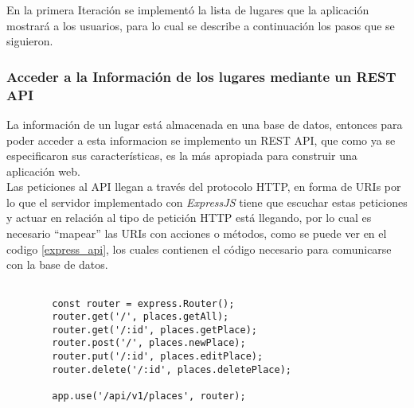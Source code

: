 %
%
%
%

En la primera Iteración se implementó la lista de lugares que la aplicación mostrará a los usuarios, para lo cual se describe a continuación los pasos que se siguieron. \\


\subsubsection{Acceder a la Información de los lugares mediante un REST API }


La información de un lugar está almacenada en una base de datos, entonces para poder acceder a esta informacion se implemento un REST API, que como ya se especificaron sus características, es la más apropiada para construir una aplicación web. \\

Las peticiones al API llegan a través del protocolo HTTP, en forma de URIs por lo que el servidor implementado con \emph{ExpressJS} tiene que escuchar estas peticiones y actuar en relación al tipo de petición HTTP está llegando, por lo cual es necesario ``mapear'' las URIs con acciones o métodos, como se puede ver en el codigo \ref{express_api}, los cuales contienen el código necesario para comunicarse con la base de datos. \\


\begin{center}
  \begin{lstlisting}[label=express_api,caption=Declarando API REST con ExpressJS]

        const router = express.Router();
        router.get('/', places.getAll);
        router.get('/:id', places.getPlace);
        router.post('/', places.newPlace);
        router.put('/:id', places.editPlace);
        router.delete('/:id', places.deletePlace);

        app.use('/api/v1/places', router);

  \end{lstlisting}
\end{center}


